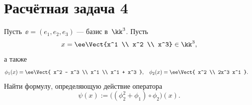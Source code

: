 \section{Расчётная задача 4}
Пусть~$\ee = (e_1, e_2, e_3)$ --- базис в~$\kk^3$.
Пусть
\[
	x =
	\ee
	\Vect{x^1 \\ x^2 \\ x^3}
	\in \kk^3
	,
\]
а также
\begin{align*}
	\phi_1(x) &=
	\ee
	\Vect{
		x^2 - x^3 \\
		x^1 \\
		x^1 + x^3
	}
	,
	&
	\phi_2(x) &=
	\ee
	\Vect{
		x^2 \\
		2x^3
		x^1
	}
	.
\end{align*}
Найти формулу, определяющую действие оператора
\[
	\psi(x) :=
	\bigl(
		(\phi_2^2 + \phi_1)
		\circ
		\phi_2
	\bigr)
	(x)
	.
\]

